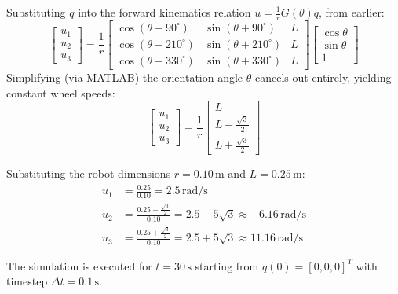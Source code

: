 \begin{enumerate}[label=\textbf{(\alph*)}]
\begin{enumerate}[label=\Roman*.]
\begin{enumerate}[label=\arabic*.]
            Substituting $\dot{q}$ into the forward kinematics relation $u = \frac{1}{r} G(\theta) \dot{q}$, from earlier:
            \begin{equation}
                \begin{bmatrix} u_1 \\ u_2 \\ u_3 \end{bmatrix} = \frac{1}{r} \begin{bmatrix}
                    \cos(\theta + 90^\circ) & \sin(\theta + 90^\circ) & L \\
                    \cos(\theta + 210^\circ) & \sin(\theta + 210^\circ) & L \\
                    \cos(\theta + 330^\circ) & \sin(\theta + 330^\circ) & L
                \end{bmatrix} \begin{bmatrix} \cos\theta \\ \sin\theta \\ 1 \end{bmatrix}
            \end{equation}
            Simplifying (via MATLAB) the orientation angle $\theta$ cancels out entirely, yielding constant wheel speeds:
            \begin{equation}
                \begin{bmatrix} u_1 \\ u_2 \\ u_3 \end{bmatrix} = \frac{1}{r} \begin{bmatrix} L \\ L - \frac{\sqrt{3}}{2} \\ L + \frac{\sqrt{3}}{2} \end{bmatrix}
            \end{equation}

            Substituting the robot dimensions $r = 0.10\,\text{m}$ and $L = 0.25\,\text{m}$:
            \begin{align}
                u_1 &= \frac{0.25}{0.10} = 2.5\,\text{rad/s} \\
                u_2 &= \frac{0.25 - \frac{\sqrt{3}}{2}}{0.10} = 2.5 - 5\sqrt{3} \approx -6.16\,\text{rad/s} \\
                u_3 &= \frac{0.25 + \frac{\sqrt{3}}{2}}{0.10} = 2.5 + 5\sqrt{3} \approx 11.16\,\text{rad/s}
            \end{align}

            The simulation is executed for $t = 30\,\text{s}$ starting from $q(0) = [0, 0, 0]^T$ with timestep $\Delta t = 0.1\,\text{s}$.


\end{enumerate}
\end{enumerate}
\end{enumerate}
